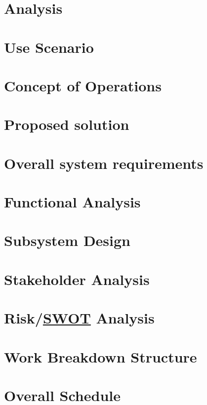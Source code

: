 \documentclass[12pt]{article}
\newcommand{\abbr}[1]{\texorpdfstring{\hyperlink{abbr:#1}{#1}}{#1}}
\numberwithin{figure}{section}
\numberwithin{table}{section}
\begin{document}
\newpage
\section{Analysis} %


\newpage
\section{Use Scenario} %


\newpage
\section{Concept of Operations} %


\newpage
\section{Proposed solution} %


\newpage
\section{Overall system requirements} %


\newpage
\section{Functional Analysis} %


\newpage
\section{Subsystem Design} %


% 

\newpage
\section{Stakeholder Analysis} %


\newpage
\section[Risk/SWOT Analysis]{Risk/\abbr{SWOT} Analysis} %


\newpage
\section{Work Breakdown Structure} %


\newpage
\section{Overall Schedule} %

\end{document}
